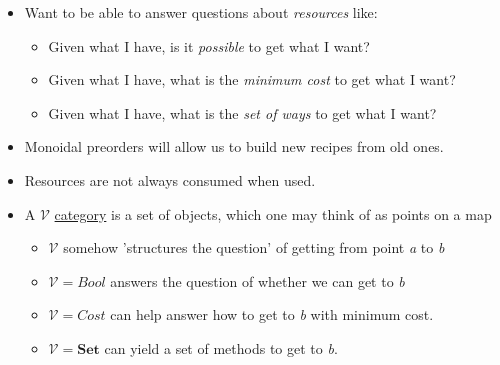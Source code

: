 \begin{itemize}
    \item Want to be able to answer questions about \emph{resources} like:
          \begin{itemize}
            \item Given what I have, is it \emph{possible} to get what I want?
            \item Given what I have, what is the \emph{minimum cost} to get what I want?
            \item Given what I have, what is the \emph{set of ways} to get what I want?\end{itemize}
    \item Monoidal preorders will allow us to build new recipes from old ones.
    \item Resources are not always consumed when used.
    \item  A $\mathcal{V}$ \hyperref[D2.46]{category} is a set of objects, which one may think of as points on a map
          \begin{itemize}
            \item  $\mathcal{V}$ somehow 'structures the question' of getting from point \emph{a} to \emph{b}
            \item  $\mathcal{V} = Bool$ answers the question of whether we can get to \emph{b}
            \item  $\mathcal{V} = Cost$ can help answer how to get to \emph{b} with minimum cost.
            \item  $\mathcal{V} = \mathbf{Set}$ can yield a set of methods to get to \emph{b}.\end{itemize}
  \end{itemize}
